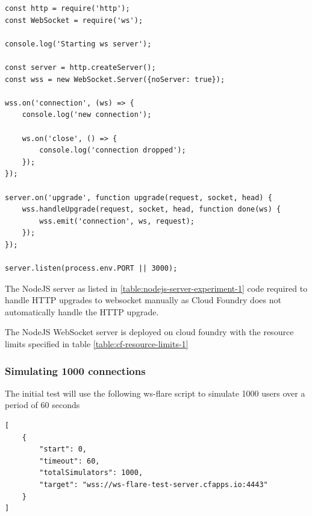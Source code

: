 \begin{listing}[H]
    \caption{NodeJS Websocket Server Implemntation}
    \label{table:nodejs-server-experiment-1}
    \begin{verbatim}
const http = require('http');
const WebSocket = require('ws');

console.log('Starting ws server');

const server = http.createServer();
const wss = new WebSocket.Server({noServer: true});

wss.on('connection', (ws) => {
    console.log('new connection');

    ws.on('close', () => {
        console.log('connection dropped');
    });
});

server.on('upgrade', function upgrade(request, socket, head) {
    wss.handleUpgrade(request, socket, head, function done(ws) {
        wss.emit('connection', ws, request);
    });
});

server.listen(process.env.PORT || 3000);
\end{verbatim}
\end{listing}

The NodeJS server as listed in \ref{table:nodejs-server-experiment-1} code required to handle HTTP upgrades to websocket manually as Cloud Foundry does not automatically handle the HTTP upgrade.

The NodeJS WebSocket server is deployed on cloud foundry with the resource limits specified in table \ref{table:cf-resource-limits-1}

\begin{table}[H]
\caption{Cloud Foundry Resource Limits}
\label{table:cf-resource-limits-1}
\end{table}

\subsubsection{Simulating 1000 connections}
The initial test will use the following ws-flare script to simulate 1000 users over a period of 60 seconds

\begin{listing}[H]
    \caption{WS-Flare test script for 1000 users}
    \label{table:nodejs-server-experiment-1}
    \begin{verbatim}
[
    {
        "start": 0,
        "timeout": 60,
        "totalSimulators": 1000,
        "target": "wss://ws-flare-test-server.cfapps.io:4443"
    }
]
\end{verbatim}
\end{listing}

